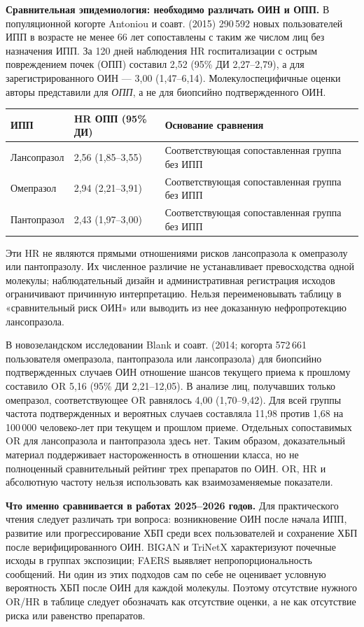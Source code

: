 \documentclass[11pt,a4paper,notitlepage]{report}
\newcommand{\src}[1]{\unskip\space\cite{#1}}
\begin{document}
\textbf{Сравнительная эпидемиология: необходимо различать ОИН и ОПП.} В популяционной когорте Antoniou и соавт. (2015) 290\,592 новых пользователей ИПП в возрасте не менее 66 лет сопоставлены с таким же числом лиц без назначения ИПП. За 120 дней наблюдения HR госпитализации с острым повреждением почек (ОПП) составил 2,52 (95\% ДИ 2,27--2,79), а для зарегистрированного ОИН --- 3,00 (1,47--6,14). Молекулоспецифичные оценки авторы представили для \emph{ОПП}, а не для биопсийно подтвержденного ОИН.\src{renalantoniou2015}
\begin{longtable}{P{0.25\textwidth}P{0.26\textwidth}P{0.40\textwidth}}
\toprule
ИПП & HR ОПП (95\% ДИ) & Основание сравнения \\
\midrule
\endhead
Лансопразол & 2,56 (1,85--3,55) & Соответствующая сопоставленная группа без ИПП \\
Омепразол & 2,94 (2,21--3,91) & Соответствующая сопоставленная группа без ИПП \\
Пантопразол & 2,43 (1,97--3,00) & Соответствующая сопоставленная группа без ИПП \\
\bottomrule
\end{longtable}
Эти HR не являются прямыми отношениями рисков лансопразола к омепразолу или пантопразолу. Их численное различие не устанавливает превосходства одной молекулы; наблюдательный дизайн и административная регистрация исходов ограничивают причинную интерпретацию. Нельзя переименовывать таблицу в «сравнительный риск ОИН» или выводить из нее доказанную нефропротекцию лансопразола.\src{renalantoniou2015}

В новозеландском исследовании Blank и соавт. (2014; когорта 572\,661 пользователя омепразола, пантопразола или лансопразола) для биопсийно подтвержденных случаев ОИН отношение шансов текущего приема к прошлому составило OR 5,16 (95\% ДИ 2,21--12,05). В анализе лиц, получавших только омепразол, соответствующее OR равнялось 4,00 (1,70--9,42). Для всей группы частота подтвержденных и вероятных случаев составляла 11,98 против 1,68 на 100\,000 человеко-лет при текущем и прошлом приеме. Отдельных сопоставимых OR для лансопразола и пантопразола здесь нет. Таким образом, доказательный материал поддерживает настороженность в отношении класса, но не полноценный сравнительный рейтинг трех препаратов по ОИН. OR, HR и абсолютную частоту нельзя использовать как взаимозаменяемые показатели.\src{renalblank2014}

\textbf{Что именно сравнивается в работах 2025--2026 годов.} Для практического чтения следует различать три вопроса: возникновение ОИН после начала ИПП, развитие или прогрессирование ХБП среди всех пользователей и сохранение ХБП после верифицированного ОИН. BIGAN и TriNetX характеризуют почечные исходы в группах экспозиции; FAERS выявляет непропорциональность сообщений. Ни один из этих подходов сам по себе не оценивает условную вероятность ХБП после ОИН для каждой молекулы. Поэтому отсутствие нужного OR/HR в таблице следует обозначать как отсутствие оценки, а не как отсутствие риска или равенство препаратов.\src{renalbigan2025,renaltrinetx2025,renalfaers2026}
\end{document}
